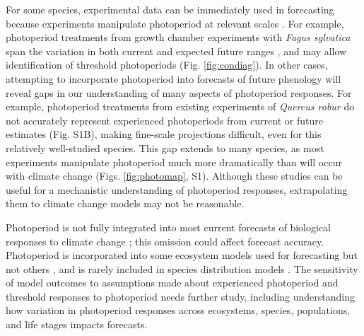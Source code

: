 \documentclass{article}
\begin{document}
\par For some species, experimental data can be immediately used in forecasting because experiments manipulate photoperiod at relevant scales \citep[e.g., ][Figs. \ref{fig:photomap}\& S1A, Table S1]{Heide:2015aa,Basler:2014aa}. For example, photoperiod treatments from growth chamber experiments with \emph{Fagus sylvatica} span the variation in both current and expected future ranges \citep[Fig. S1A, ][]{duputie2015}, and may allow identification of threshold photoperiods (Fig. \ref{fig:condiag}). In other cases, attempting to incorporate photoperiod into forecasts of future phenology will reveal gaps in our understanding of many aspects of photoperiod responses. For example, photoperiod treatments from existing experiments of \emph{Quercus robur} do not accurately represent experienced photoperiods from current or future estimates (Fig. S1B), making fine-scale projections difficult, even for this relatively well-studied species. This gap extends to many species, as most experiments manipulate photoperiod much more dramatically than will occur with climate change (Figs. \ref{fig:photomap}, S1). Although these studies can be useful for a mechanistic understanding of photoperiod responses, extrapolating them to climate change models may not be reasonable. 
 

\par Photoperiod is not fully integrated into most current forecasts of biological responses to climate change \citep[but see][for an example in insects]{tobin2008}; this omission could affect forecast accuracy. Photoperiod is incorporated into some ecosystem models \citep[e.g., the Ecosystem Demography model] []{jolly2005,medvigy2013} used for forecasting but not others \citep[e.g.,][]{richardson2012}, and is rarely included in species distribution models \citep[e.g.,] []{morin2009,zhu2012}. The sensitivity of model outcomes to assumptions made about experienced photoperiod and threshold responses to photoperiod needs further study, including understanding how variation in photoperiod responses across ecosystems, species, populations, and life stages impacts forecasts. %
\end{document}
